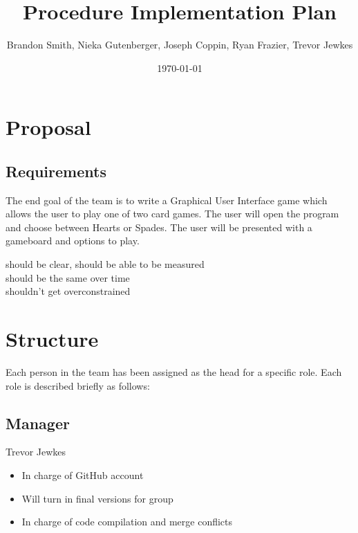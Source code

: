 \documentclass[11pt, titlepage]{article}
\author{Brandon Smith, Nieka Gutenberger, Joseph Coppin, Ryan Frazier, Trevor Jewkes}
\title{Procedure Implementation Plan}
\date{\today}
\begin{document}
	\maketitle
    \setcounter{tocdepth}{1}
\section{Proposal}    
    
    \subsection{Requirements}
    
    The end goal of the team is to write a Graphical User Interface game which allows the user to play one of two card games.  The user will open the program and choose between Hearts or Spades.  The user will be presented with a gameboard and options to play. 
    
    \par should be clear, should be able to be measured\\
    should be the same over time\\
    shouldn't get overconstrained\\
    
    \section{Structure}
    	Each person in the team has been assigned as the head for a specific role.  		Each role is described briefly as follows:
    
    \subsection{Manager} 
	    Trevor Jewkes
    	\begin{itemize}
    		\item In charge of GitHub account
    		\item Will turn in final versions for group
    		\item In charge of code compilation and merge conflicts
    	\end{itemize}
   
\end{document}
